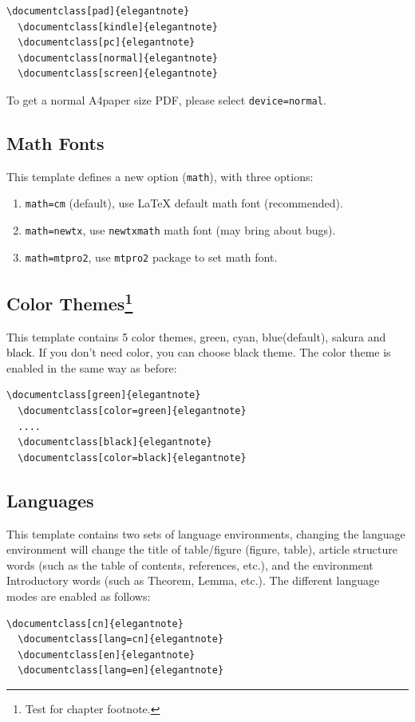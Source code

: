 \documentclass[en,hazy,device=normal,blue,14pt]{elegantnote}
\begin{document}
\begin{lstlisting}[frame=none]  
  \documentclass[pad]{elegantnote}
  \documentclass[kindle]{elegantnote}
  \documentclass[pc]{elegantnote}
  \documentclass[normal]{elegantnote}
  \documentclass[screen]{elegantnote}
\end{lstlisting}

\begin{note}
To get a normal A4paper size PDF, please select \lstinline{device=normal}.
\end{note}

\subsection{Math Fonts}

This template defines a new option (\lstinline{math}), with three options:

\begin{enumerate}
  \item \lstinline{math=cm} (default), use \LaTeX{} default math font (recommended).
  \item \lstinline{math=newtx}, use \lstinline{newtxmath} math font (may bring about bugs).
  \item \lstinline{math=mtpro2}, use \lstinline{mtpro2} package to set math font.
\end{enumerate}


\subsection[Color Themes]{Color Themes\footnote{Test for chapter footnote.}}

This template contains 5 color themes, \textcolor{egreen}{green}, \textcolor{ecyan}{cyan}, \textcolor{eblue}{blue}(default), \textcolor{sakura}{sakura} and \textcolor{black}{black}. If you don't need color, you can choose black theme. The color theme is enabled in the same way as before:
\begin{lstlisting}[frame=none]  
  \documentclass[green]{elegantnote}
  \documentclass[color=green]{elegantnote}
  ....
  \documentclass[black]{elegantnote}
  \documentclass[color=black]{elegantnote}
\end{lstlisting}


\subsection{Languages}

This template contains two sets of language environments, changing the language environment will change the title of table/figure (figure, table), article structure words (such as the table of contents, references, etc.), and the environment Introductory words (such as Theorem, Lemma, etc.). The different language modes are enabled as follows:
\begin{lstlisting}[frame=none]  
  \documentclass[cn]{elegantnote}
  \documentclass[lang=cn]{elegantnote}
  \documentclass[en]{elegantnote}
  \documentclass[lang=en]{elegantnote}
\end{lstlisting}
\end{document}
